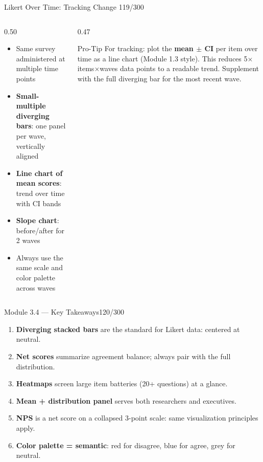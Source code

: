 \documentclass[10pt]{beamer}
\newcommand{\smark}[1]{\hfill{\scriptsize\color{codegray}#1}}
\begin{document}
\begin{frame}{Likert Over Time: Tracking Change}
\smark{119/300}
\begin{columns}[T]
\begin{column}{0.50\textwidth}
\begin{itemize}
    \item Same survey administered at multiple time points
    \item \textbf{Small-multiple diverging bars}: one panel per wave, vertically aligned
    \item \textbf{Line chart of mean scores}: trend over time with CI bands
    \item \textbf{Slope chart}: before/after for 2 waves
    \item Always use the same scale and color palette across waves
\end{itemize}
\end{column}
\begin{column}{0.47\textwidth}
\begin{alertblock}{Pro-Tip}
    \scriptsize For tracking: plot the \textbf{mean $\pm$ CI} per item over time as a line chart (Module 1.3 style). This reduces 5$\times$items$\times$waves data points to a readable trend. Supplement with the full diverging bar for the most recent wave.
\end{alertblock}
\end{column}
\end{columns}
\end{frame}

\begin{frame}{Module 3.4 --- Key Takeaways}\smark{120/300}
\begin{enumerate}
    \item \textbf{Diverging stacked bars} are the standard for Likert data: centered at neutral.
    \item \textbf{Net scores} summarize agreement balance; always pair with the full distribution.
    \item \textbf{Heatmaps} screen large item batteries (20+ questions) at a glance.
    \item \textbf{Mean + distribution panel} serves both researchers and executives.
    \item \textbf{NPS} is a net score on a collapsed 3-point scale: same visualization principles apply.
    \item \textbf{Color palette = semantic}: red for disagree, blue for agree, grey for neutral.
\end{enumerate}
\end{frame}
\end{document}
